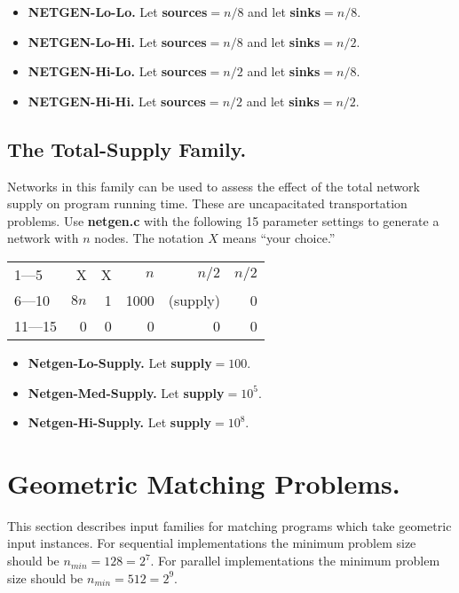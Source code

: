 \begin{itemize}
\item {\bf NETGEN-Lo-Lo.}  Let {\bf sources}$=n/8$ and let 
{\bf sinks}$=n/8$.

\item {\bf NETGEN-Lo-Hi.}  Let {\bf sources}$=n/8$ and let 
{\bf sinks}$=n/2$.

\item {\bf NETGEN-Hi-Lo.}  Let {\bf sources}$=n/2$ and let
{\bf sinks}$=n/8$.

\item {\bf NETGEN-Hi-Hi.} Let {\bf sources}$=n/2$ and let 
{\bf sinks}$=n/2$.
\end{itemize}

\subsection{The Total-Supply Family.}

Networks in this family can be used to assess the effect of the total
network supply on program running time.  These are uncapacitated
transportation problems.  Use {\bf netgen.c} with the following 15
parameter settings to generate a network with $n$ nodes.  The notation
$X$ means ``your choice.''

\vspace{.2in} 
\begin{tabular}{|l|rrrrr|} \hline
1---5 & X & X & $n$ & $n/2$ & $n/2$ \\ 
6---10 & $8n $ & 1 & 1000 & (supply) & 0 \\ 
11---15 & 0 & 0 & 0 & 0 & 0 \\ \hline
\end{tabular}

\begin{itemize}
\item{\bf Netgen-Lo-Supply.}  Let {\bf supply}$= 100$. 
\item {\bf Netgen-Med-Supply.} Let {\bf supply}$= 10^5$. 
\item {\bf Netgen-Hi-Supply.} Let {\bf supply}$= 10^8$.  
\end{itemize} 

\section{Geometric Matching Problems.}

This section describes input families for matching programs which take
geometric input instances.  For sequential implementations the minimum
problem size should be $n_{min} = 128 = 2^7$.  For parallel implementations
the minimum problem size should be $n_{min} = 512 = 2^9$.  

